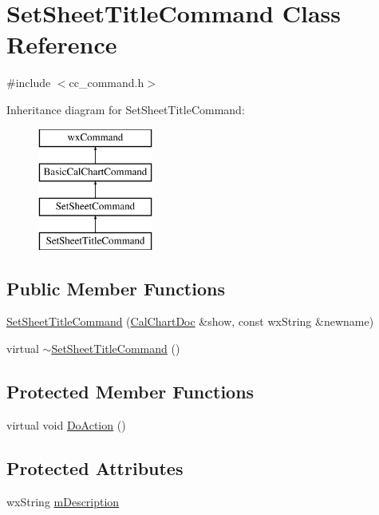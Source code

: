 \hypertarget{a00135}{\section{Set\-Sheet\-Title\-Command Class Reference}
\label{a00135}
}


{\ttfamily \#include $<$cc\-\_\-command.\-h$>$}

Inheritance diagram for Set\-Sheet\-Title\-Command\-:\begin{figure}[H]
\begin{center}
\leavevmode
\includegraphics[height=4.000000cm]{a00135}
\end{center}
\end{figure}
\subsection*{Public Member Functions}
\begin{DoxyCompactItemize}
\item 
\hyperlink{a00135_a7cbdf6c7a962ba1f26e14ca3fbb8089b}{Set\-Sheet\-Title\-Command} (\hyperlink{a00020}{Cal\-Chart\-Doc} \&show, const wx\-String \&newname)
\item 
virtual \hyperlink{a00135_a0bdd38a12529cdf5d519811b5b2ea02b}{$\sim$\-Set\-Sheet\-Title\-Command} ()
\end{DoxyCompactItemize}
\subsection*{Protected Member Functions}
\begin{DoxyCompactItemize}
\item 
virtual void \hyperlink{a00135_ab2e45d322adbc00b829917145585e152}{Do\-Action} ()
\end{DoxyCompactItemize}
\subsection*{Protected Attributes}
\begin{DoxyCompactItemize}
\item 
wx\-String \hyperlink{a00135_a1dfaa858067eba21fe735b5420146cfb}{m\-Description}
\end{DoxyCompactItemize}


